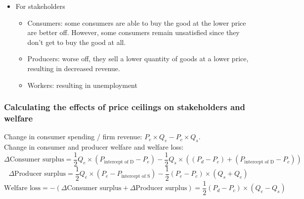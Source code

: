 \documentclass[a4paper,12pt]{article}
\begin{document}
\begin{itemize}
\begin{itemize}
  \end{itemize}
  \item For stakeholders
  \begin{itemize}
    \item Consumers: some consumers are able to buy the good at the lower price are better off. However, some consumers remain unsatisfied since they don't get to buy the good at all.
    \item Producers: worse off, they sell a lower quantity of goods at a lower price, resulting in decreased revenue.
    \item Workers: resulting in unemployment
  \end{itemize}
\end{itemize}
\subsubsection*{Calculating the effects of price ceilings on stakeholders and welfare}
Change in consumer spending / firm revenue: $P_e\times Q_e-P_c\times Q_s$.\\
Change in consumer and producer welfare and welfare loss:
\[\Delta \text{Consumer surplus}=\dfrac{1}{2}Q_e\times (P_\text{intercept of D}-P_e)-\dfrac{1}{2}Q_s\times((P_d-P_c)+(P_\text{intercept of D}-P_c))\]
\[\Delta \text{Producer surplus}=\dfrac{1}{2}Q_e\times(P_e-P_\text{intercept of S})-\dfrac{1}{2}(P_e-P_c)\times (Q_s+Q_e)\]
\[\text{Welfare loss}=-(\Delta \text{Consumer surplus}+\Delta \text{Producer surplus})=\dfrac{1}{2}(P_d-P_c)\times (Q_e-Q_s)\]
\begin{center}
\end{center}
\end{document}
